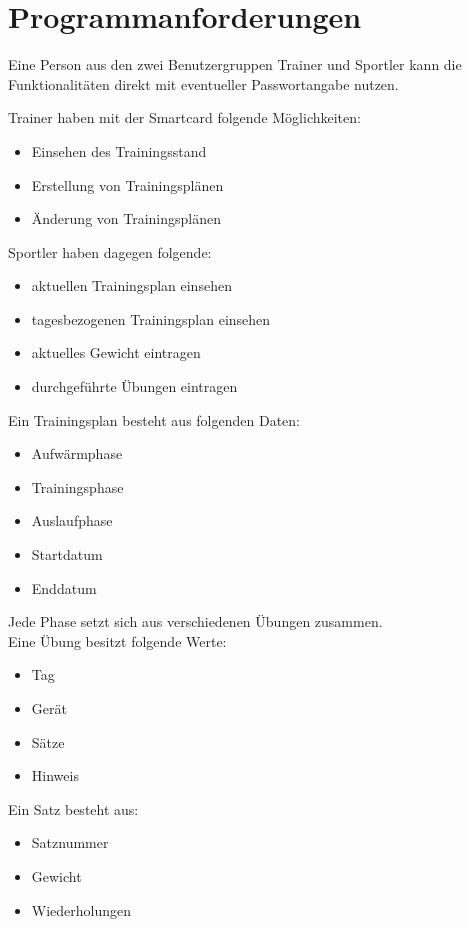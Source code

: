 \documentclass[a4paper,12pt]{article}
\begin{document}
\section{Programmanforderungen}
Eine Person aus den zwei Benutzergruppen Trainer und Sportler kann die Funktionalitäten direkt mit eventueller Passwortangabe nutzen.

Trainer haben mit der Smartcard folgende Möglichkeiten:
\begin{itemize}
\item Einsehen des Trainingsstand
\item Erstellung von Trainingsplänen
\item Änderung von Trainingsplänen
\end{itemize}

Sportler haben dagegen folgende:
\begin{itemize}
\item aktuellen Trainingsplan einsehen
\item tagesbezogenen Trainingsplan einsehen
\item aktuelles Gewicht eintragen
\item durchgeführte Übungen eintragen
\end{itemize}

Ein Trainingsplan besteht aus folgenden Daten:
\begin{itemize}
\item Aufwärmphase
\item Trainingsphase
\item Auslaufphase
\item Startdatum
\item Enddatum
\end{itemize}

Jede Phase setzt sich aus verschiedenen Übungen zusammen.\\
Eine Übung besitzt folgende Werte:
\begin{itemize}
\item Tag
\item Gerät
\item Sätze
\item Hinweis
\end{itemize}

Ein Satz besteht aus:
\begin{itemize}
\item Satznummer
\item Gewicht
\item Wiederholungen
\end{itemize}
\end{document}
